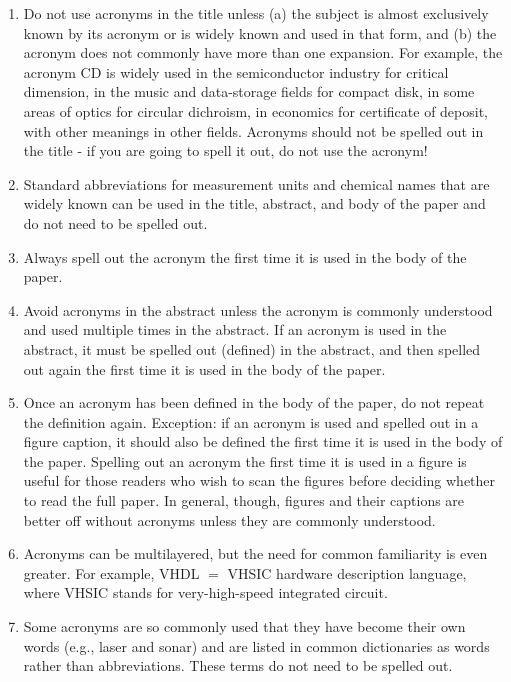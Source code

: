 \begin{enumerate}
  \item Do not use acronyms in the title unless (a) the subject is almost exclusively known by its acronym or is widely known and used in that form, and (b) the acronym does not commonly have more than one expansion. For example, the acronym $\mathrm{CD}$ is widely used in the semiconductor industry for critical dimension, in the music and data-storage fields for compact disk, in some areas of optics for circular dichroism, in economics for certificate of deposit, with other meanings in other fields. Acronyms should not be spelled out in the title - if you are going to spell it out, do not use the acronym!

  \item Standard abbreviations for measurement units and chemical names that are widely known can be used in the title, abstract, and body of the paper and do not need to be spelled out.

  \item Always spell out the acronym the first time it is used in the body of the paper.

  \item Avoid acronyms in the abstract unless the acronym is commonly understood and used multiple times in the abstract. If an acronym is used in the abstract, it must be spelled out (defined) in the abstract, and then spelled out again the first time it is used in the body of the paper.

  \item Once an acronym has been defined in the body of the paper, do not repeat the definition again. Exception: if an acronym is used and spelled out in a figure caption, it should also be defined the first time it is used in the body of the paper. Spelling out an acronym the first time it is used in a figure is useful for those readers who wish to scan the figures before deciding whether to read the full paper. In general, though, figures and their captions are better off without acronyms unless they are commonly understood.

  \item Acronyms can be multilayered, but the need for common familiarity is even greater. For example, VHDL $=$ VHSIC hardware description language, where VHSIC stands for very-high-speed integrated circuit.

  \item Some acronyms are so commonly used that they have become their own words (e.g., laser and sonar) and are listed in common dictionaries as words rather than abbreviations. These terms do not need to be spelled out.

\end{enumerate}

